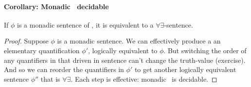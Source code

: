 \paragraph{Corollary: Monadic \ltwo\ decidable}

\begin{theorem}
	If $\phi$ is a monadic sentence of \ltwo, it is equivalent to a $\forall\exists$-sentence. \begin{proof}
		Suppose $\phi$ is a monadic sentence.  We can effectively produce a an elementary quantification $\phi'$, logically equivalent to $\phi$.   But switching the order of any quantifiers in that driven in sentence can't change the truth-value (exercise). And so we can reorder the quantifiers in $\phi'$ to get another logically equivalent sentence $\phi''$ that is $\forall\exists$. Each step is effective: monadic \ltwo\ is decidable.
	\end{proof}
\end{theorem}

